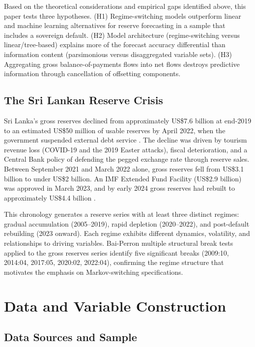 \documentclass[12pt,a4paper]{article}
\begin{document}
Based on the theoretical considerations and empirical gaps identified above, this paper tests three hypotheses. (H1) Regime-switching models outperform linear and machine learning alternatives for reserve forecasting in a sample that includes a sovereign default. (H2) Model architecture (regime-switching versus linear/tree-based) explains more of the forecast accuracy differential than information content (parsimonious versus disaggregated variable sets). (H3) Aggregating gross balance-of-payments flows into net flows destroys predictive information through cancellation of offsetting components.

\subsection{The Sri Lankan Reserve Crisis}

Sri Lanka's gross reserves declined from approximately US\$7.6 billion at end-2019 to an estimated US\$50 million of usable reserves by April 2022, when the government suspended external debt service \citep{Athukorala2024}. The decline was driven by tourism revenue loss (COVID-19 and the 2019 Easter attacks), fiscal deterioration, and a Central Bank policy of defending the pegged exchange rate through reserve sales. Between September 2021 and March 2022 alone, gross reserves fell from US\$3.1 billion to under US\$2 billion. An IMF Extended Fund Facility (US\$2.9 billion) was approved in March 2023, and by early 2024 gross reserves had rebuilt to approximately US\$4.4 billion \citep{Weerakoon2023,UNDP2022}.

This chronology generates a reserve series with at least three distinct regimes: gradual accumulation (2005--2019), rapid depletion (2020--2022), and post-default rebuilding (2023 onward). Each regime exhibits different dynamics, volatility, and relationships to driving variables. Bai-Perron multiple structural break tests applied to the gross reserves series identify five significant breaks (2009:10, 2014:04, 2017:05, 2020:02, 2022:04), confirming the regime structure that motivates the emphasis on Markov-switching specifications.

\section{Data and Variable Construction}

\subsection{Data Sources and Sample}
\end{document}
